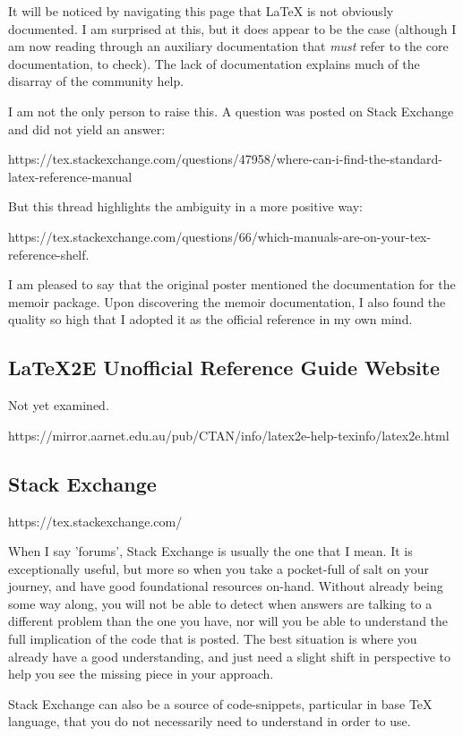 \documentclass[11pt, oneside]{memoir}
\begin{document}
It will be noticed by navigating this page that LaTeX is not obviously documented. I am surprised at this, but it does appear to be the case (although I am now reading through an auxiliary documentation that \emph{must} refer to the core documentation, to check). The lack of documentation explains much of the disarray of the community help.

I am not the only person to raise this. A question was posted on Stack Exchange and did not yield an answer:

https://tex.stackexchange.com/questions/47958/where-can-i-find-the-standard-latex-reference-manual

But this thread highlights the ambiguity in a more positive way: 

https://tex.stackexchange.com/questions/66/which-manuals-are-on-your-tex-reference-shelf. 

I am pleased to say that the original poster mentioned the documentation for the memoir package. Upon discovering the memoir documentation, I also found the quality so high that I adopted it as the official reference in my own mind.

\subsection{LaTeX2E Unofficial Reference Guide Website}

Not yet examined.

https://mirror.aarnet.edu.au/pub/CTAN/info/latex2e-help-texinfo/latex2e.html

\subsection{Stack Exchange}

https://tex.stackexchange.com/

When I say 'forums', Stack Exchange is usually the one that I mean. It is exceptionally useful, but more so when you take a pocket-full of salt on your journey, and have good foundational resources on-hand. Without already being some way along, you will not be able to detect when answers are talking to a different problem than the one you have, nor will you be able to understand the full implication of the code that is posted. The best situation is where you already have a good understanding, and just need a slight shift in perspective to help you see the missing piece in your approach.

Stack Exchange can also be a source of code-snippets, particular in base TeX language, that you do not necessarily need to understand in order to use.
\end{document}
